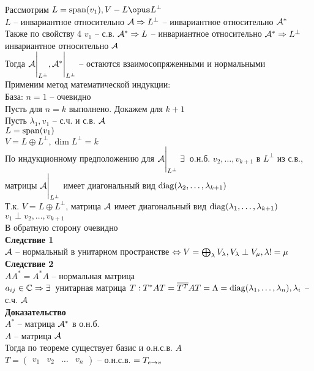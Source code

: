 \documentclass[12pt]{article}
\begin{document}
Рассмотрим $L = \span(v_1), V - L \opus L^\perp$\\
$L$ -- инвариантное относительно $\mathcal{A} \Rightarrow L^\perp$ -- инвариантное относительно $\mathcal{A}^*$\\
Также по свойству 4 $v_1$ -- с.в. $\mathcal{A}^* \Rightarrow L$ -- инвариантное относительно $\mathcal{A}^* \Rightarrow L^\perp$ инвариантное относительно $\mathcal{A}$\\
Тогда $\mathcal{A} \Biggr|_{L^\perp}, \mathcal{A}^* \Biggr|_{L^\perp}$ -- остаются взаимосопряженными и нормальными\\
Применим метод математической индукции:\\
База: $n = 1$ -- очевидно\\
Пусть для $n = k$ выполнено. Докажем для $k+1$\\
Пусть $ \lambda_1, v_1$ -- с.ч. и с.в. $\mathcal{A}$\\
$L = \operatorname{span}(v_1)$\\
$V = L \oplus L^\perp, \dim L^\perp = k$\\
По индукционному предположению для $\mathcal{A}\Biggr|_{L^\perp}\ \exists\,$ о.н.б. $v_2, \ldots, v_{k+1}$ в $L^\perp$ из с.в., матрицы $\mathcal{A}\Biggr|_{L^\perp}$ имеет диагональный вид $\operatorname{diag}( \lambda_2, \ldots, \lambda_{k+1})$\\
Т.к. $V = L\oplus L^\perp$, матрица $\mathcal{A}$ имеет диагональный вид $\operatorname{diag}( \lambda_1, \ldots, \lambda_{k+1})$\\
$v_1 \perp v_2, \ldots, v_{k+1}$\\
В обратную сторону очевидно\\
\textbf{Следствие 1}\\
$\mathcal{A}$ -- нормальный в унитарном пространстве $\Leftrightarrow V = \bigoplus_{ \lambda}V_\lambda, V_\lambda \perp V_\mu, \lambda != \mu$\\
\textbf{Следствие 2}\\
$AA^* = A^*A$ -- нормальная матрица\\
$a_{ij} \in \mathbb{C} \Rightarrow \exists\,$ унитарная матрица $T: T^*AT = \overline{T^T}AT = \Lambda = \operatorname{diag}( \lambda_1, \ldots, \lambda_n), \lambda_i$ -- с.ч. $\mathcal{A}$\\
\textbf{Доказательство}\\
$A^*$ -- матрица $\mathcal{A}^*$ в о.н.б.\\
$A$ -- матрица $\mathcal{A}$\\
Тогда по теореме существует базис и о.н.с.в. $A$\\
$T = \begin{pmatrix}
    v_1 & v_2 & \ldots & v_n
\end{pmatrix}$ -- о.н.с.в. $= T_{e\rightarrow v}$\\
\end{document}
